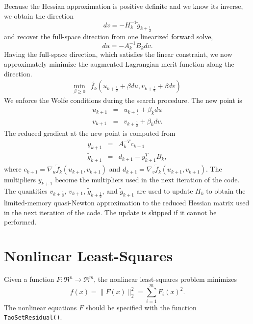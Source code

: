 Because the Hessian approximation is positive definite and we know its
inverse, we obtain the direction
\[
  dv = -H_k^{-1} \tilde{g}_{k+\frac{1}{2}}
\]
and recover the full-space direction from one linearized forward solve,
\[
  du = -A_k^{-1} B_k dv.
\]
Having the full-space direction, which satisfies the linear constraint, 
we now approximately minimize the augmented Lagrangian merit function 
along the direction.
\[
\begin{array}{lcl}
\displaystyle \min_{\beta \geq 0} & \tilde{f_k}(u_{k+\frac{1}{2}} + \beta du, v_{k+\frac{1}{2}} + \beta dv)
\end{array}
\]
We enforce the Wolfe conditions during the search procedure.  The new point
is
\[
\begin{array}{lcl}
u_{k+1} & = & u_{k+\frac{1}{2}} + \beta_k du \\
v_{k+1} & = & v_{k+\frac{1}{2}} + \beta_k dv.
\end{array}
\]
The reduced gradient at the new point is computed from
\[
\begin{array}{lcl}
y_{k+1} & = & A_k^{-T}c_{k+1} \\
\tilde{g}_{k+1} & = & d_{k+1} - y_{k+1}^T B_k,
\end{array}
\]
where $c_{k+1} = \nabla_u \tilde{f}_k (u_{k+1},v_{k+1})$ and
$d_{k+1} = \nabla_v \tilde{f}_k (u_{k+1},v_{k+1})$.  The
multipliers $y_{k+1}$ become the multipliers used in the
next iteration of the code.  The quantities $v_{k+\frac{1}{2}}$,
$v_{k+1}$, $\tilde{g}_{k+\frac{1}{2}}$, and $\tilde{g}_{k+1}$ are
used to update $H_k$ to obtain the limited-memory quasi-Newton
approximation to the reduced Hessian matrix used in the next
iteration of the code.  The update is skipped if it cannot be
performed.

\section{Nonlinear Least-Squares}
\label{sec:leastsquares}
Given a function $F: \Re^n \to \Re^m$, the nonlinear least-squares 
problem minimizes 
\begin{equation} 
 f(x)= \| F(x) \|_2^2 = \sum_{i=1}^m F_i(x)^2.
 \label{eq:nlsf}
\end{equation}
The nonlinear equations $F$ should be specified with the function
{\tt TaoSetResidual()}. 

